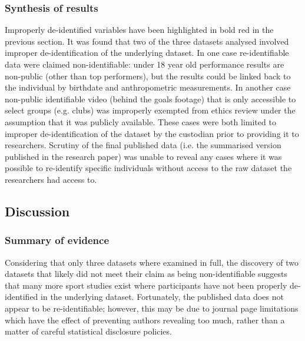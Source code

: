 \subsubsection{Synthesis of results}

Improperly de-identified variables have been highlighted in bold  red in the previous section. It was found that two of the three datasets analysed involved improper de-identification of the underlying dataset. In one case re-identifiable data were claimed non-identifiable: under 18 year old performance results are non-public (other than top performers), but the results could be linked back to the individual by birthdate and anthropometric measurements. In another case non-public identifiable video (behind the goals footage) that is only accessible to select groups (e.g. clubs) was improperly exempted from ethics review under the assumption that it was publicly available. These cases were both limited to improper de-identification of the dataset by the custodian prior to providing it to researchers. Scrutiny of the final published data (i.e. the summarised version published in the research paper) was unable to reveal any cases where it was possible to re-identify specific individuals without access to the raw dataset the researchers had access to.


\subsection{Discussion}

\subsubsection{Summary of evidence}

Considering that only three datasets where examined in full, the discovery of two datasets that likely did not meet their claim as being non-identifiable suggests that many more sport studies exist where participants have not been properly de-identified in the underlying dataset. Fortunately, the published data does not appear to be re-identifiable; however, this may be due to journal page limitations which have the effect of preventing authors revealing too much, rather than a matter of careful statistical disclosure policies.

